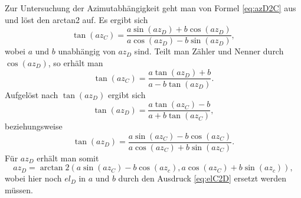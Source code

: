 Zur Untersuchung der Azimutabhängigkeit geht man von Formel \ref{eq:azD2C} aus und löst den arctan2 auf. Es ergibt sich
\begin{equation}
\tan\left(az_C\right)=\frac{a\sin\left(az_D\right)+b\cos\left(az_D\right)}{a\cos\left(az_D\right)-b\sin\left(az_D\right)},
\end{equation}
wobei $a$ und $b$ unabhängig von $az_D$ sind. Teilt man Zähler und Nenner durch $\cos\left(az_D\right)$, so erhält man
\begin{equation}
\tan\left(az_C\right)=\frac{a\tan\left(az_D\right)+b}{a-b\tan\left(az_D\right)}.
\end{equation}
Aufgelöst nach $\tan\left(az_D\right)$ ergibt sich
\begin{equation}
\tan\left(az_D\right)=\frac{a\tan\left(az_C\right)-b}{a+b\tan\left(az_C\right)},
\end{equation}
beziehungsweise
\begin{equation}
\tan\left(az_D\right)=\frac{a\sin\left(az_C\right)-b\cos\left(az_C\right)}{a\cos\left(az_C\right)+b\sin\left(az_C\right)}.
\end{equation}
Für $az_D$ erhält man somit 
\begin{equation}
az_D=\arctan 2\left(
a\sin\left(az_C\right)-b\cos\left(az_c\right),a\cos\left(az_C\right)+b\sin\left(az_c\right)\right),
\label{eq:azC2D}
\end{equation}
wobei hier noch $el_D$ in $a$ und $b$ durch den Ausdruck \ref{eq:elC2D} ersetzt werden müssen.


